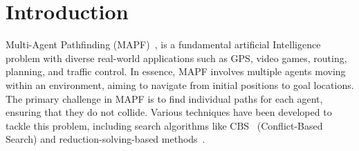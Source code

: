 \section{Introduction}



Multi-Agent Pathfinding (MAPF)~\cite{ststfekomawaliatcokubabo19a,ststfekomawaliatcokubabo19b,stern19a}, is a fundamental artificial Intelligence problem with diverse real-world applications such as GPS, video games, routing, planning, and traffic control. In essence, MAPF involves multiple agents moving within an environment, aiming to navigate from initial positions to goal locations. The primary challenge in MAPF is to find individual paths for each agent, ensuring that they do not collide. Various techniques have been developed to tackle this problem, including search algorithms like CBS~\cite{shstfest15a} (Conflict-Based Search) and reduction-solving-based methods~\cite{barsva19a}.

